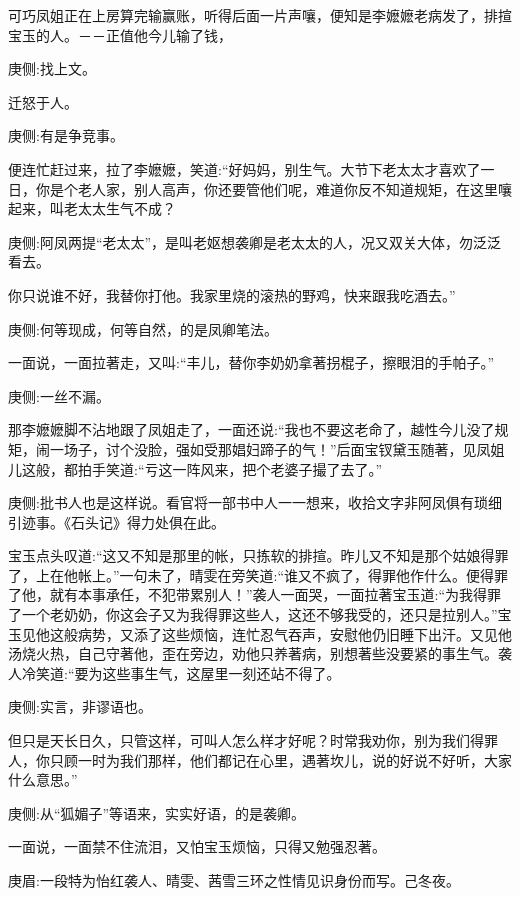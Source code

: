 \begin{parag}
    可巧凤姐正在上房算完输赢账，听得后面一片声嚷，便知是李嬷嬷老病发了，排揎宝玉的人。－－正值他今儿输了钱，\begin{note}庚侧:找上文。\end{note}迁怒于人。\begin{note}庚侧:有是争竞事。\end{note}便连忙赶过来，拉了李嬷嬷，笑道:“好妈妈，别生气。大节下老太太才喜欢了一日，你是个老人家，别人高声，你还要管他们呢，难道你反不知道规矩，在这里嚷起来，叫老太太生气不成？\begin{note}庚侧:阿凤两提“老太太”，是叫老妪想袭卿是老太太的人，况又双关大体，勿泛泛看去。\end{note}你只说谁不好，我替你打他。我家里烧的滚热的野鸡，快来跟我吃酒去。”\begin{note}庚侧:何等现成，何等自然，的是凤卿笔法。\end{note}一面说，一面拉著走，又叫:“丰儿，替你李奶奶拿著拐棍子，擦眼泪的手帕子。”\begin{note}庚侧:一丝不漏。\end{note}那李嬷嬷脚不沾地跟了凤姐走了，一面还说:“我也不要这老命了，越性今儿没了规矩，闹一场子，讨个没脸，强如受那娼妇蹄子的气！”后面宝钗黛玉随著，见凤姐儿这般，都拍手笑道:“亏这一阵风来，把个老婆子撮了去了。”\begin{note}庚侧:批书人也是这样说。看官将一部书中人一一想来，收拾文字非阿凤俱有琐细引迹事。《石头记》得力处俱在此。\end{note}
\end{parag}


\begin{parag}
    宝玉点头叹道:“这又不知是那里的帐，只拣软的排揎。昨儿又不知是那个姑娘得罪了，上在他帐上。”一句未了，晴雯在旁笑道:“谁又不疯了，得罪他作什么。便得罪了他，就有本事承任，不犯带累别人！”袭人一面哭，一面拉著宝玉道:“为我得罪了一个老奶奶，你这会子又为我得罪这些人，这还不够我受的，还只是拉别人。”宝玉见他这般病势，又添了这些烦恼，连忙忍气吞声，安慰他仍旧睡下出汗。又见他汤烧火热，自己守著他，歪在旁边，劝他只养著病，别想著些没要紧的事生气。袭人冷笑道:“要为这些事生气，这屋里一刻还站不得了。\begin{note}庚侧:实言，非谬语也。\end{note}但只是天长日久，只管这样，可叫人怎么样才好呢？时常我劝你，别为我们得罪人，你只顾一时为我们那样，他们都记在心里，遇著坎儿，说的好说不好听，大家什么意思。”\begin{note}庚侧:从“狐媚子”等语来，实实好语，的是袭卿。\end{note}一面说，一面禁不住流泪，又怕宝玉烦恼，只得又勉强忍著。\begin{note}庚眉:一段特为怡红袭人、晴雯、茜雪三环之性情见识身份而写。己冬夜。\end{note}
\end{parag}


